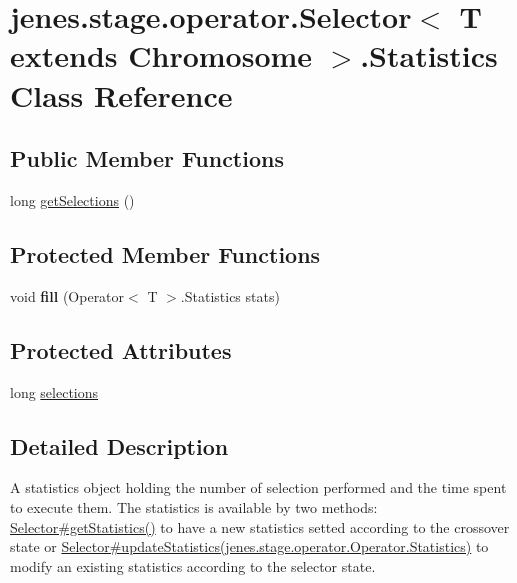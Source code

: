 \hypertarget{classjenes_1_1stage_1_1operator_1_1_selector_3_01_t_01extends_01_chromosome_01_4_1_1_statistics}{
\section{jenes.stage.operator.Selector$<$ T extends Chromosome $>$.Statistics Class Reference}
\label{classjenes_1_1stage_1_1operator_1_1_selector_3_01_t_01extends_01_chromosome_01_4_1_1_statistics}
}
\subsection*{Public Member Functions}
\begin{CompactItemize}
\item 
long \hyperlink{classjenes_1_1stage_1_1operator_1_1_selector_3_01_t_01extends_01_chromosome_01_4_1_1_statistics_0145f6cec84ff007289d206f579a117a}{getSelections} ()
\end{CompactItemize}
\subsection*{Protected Member Functions}
\begin{CompactItemize}
\item 
\hypertarget{classjenes_1_1stage_1_1operator_1_1_selector_3_01_t_01extends_01_chromosome_01_4_1_1_statistics_b1db0e72568009d65141927f039ffe84}{
void \textbf{fill} (Operator$<$ T $>$.Statistics stats)}
\label{classjenes_1_1stage_1_1operator_1_1_selector_3_01_t_01extends_01_chromosome_01_4_1_1_statistics_b1db0e72568009d65141927f039ffe84}

\end{CompactItemize}
\subsection*{Protected Attributes}
\begin{CompactItemize}
\item 
long \hyperlink{classjenes_1_1stage_1_1operator_1_1_selector_3_01_t_01extends_01_chromosome_01_4_1_1_statistics_8308f3f0177bfe79fcbf46bd4ac93cc4}{selections}
\end{CompactItemize}


\subsection{Detailed Description}
A statistics object holding the number of selection performed and the time spent to execute them. The statistics is available by two methods: \hyperlink{}{Selector\#getStatistics()} to have a new statistics setted according to the crossover state or \hyperlink{}{Selector\#updateStatistics(jenes.stage.operator.Operator.Statistics)} to modify an existing statistics according to the selector state. 

